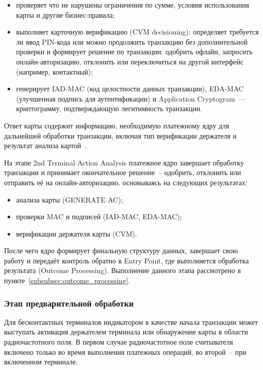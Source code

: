 \begin{itemize}
    \item проверяет что не нарушены ограничения по сумме, условия использования карты и другие бизнес-правила;
    \item выполняет карточную верификацию (CVM decisioning): определяет требуется ли ввод PIN-кода или можно продолжить транзакцию без дополнительной проверки и формирует решение по транзакции: одобрить офлайн, запросить онлайн-авторизацию, отклонить или переключиться на другой интерфейс (например, контактный);
    \item генерирует IAD-MAC (код целостности данных транзакции), EDA-MAC (улучшенная подпись для аутентификации) и Application Cryptogram~--- криптограмму, подтверждающую легитимность транзакции.
\end{itemize}

Ответ карты содержит информацию, необходимую платежному ядру для дальнейшей обработки транзакции, включая тип верификации держателя и результат анализа картой~\cite{emv_book_c8}.

На этапе 2nd Terminal Action Analysis платежное ядро завершает обработку транзакции и принимает окончательное решение~-- одобрить, отклонить или отправить её на онлайн-авторизацию, основываясь на следующих результатах:
\begin{itemize}
    \item анализа карты (GENERATE AC);
    \item проверки MAC и подписей (IAD-MAC, EDA-MAC);
    \item верификации держателя карты (CVM).
\end{itemize}

После чего ядро формирует финальную структуру данных, завершает свою работу и передаёт контроль обратно в Entry Point, где выполняется обработка результата (Outcome Processing).
Выполнение данного этапа рассмотрено в пункте~\ref{subsubsec:outcome_processing}.


\subsubsection{Этап предварительной обработки}
\label{subsubsec:pre-processing}

Для бесконтактных терминалов индикатором в качестве начала транзакции может выступать активация держателем терминала или обнаружение карты в области радиочастотного поля.
В первом случае радиочастотное поле считывателя включено только во время выполнения платежных операций, во второй~-- при включенном терминале.

